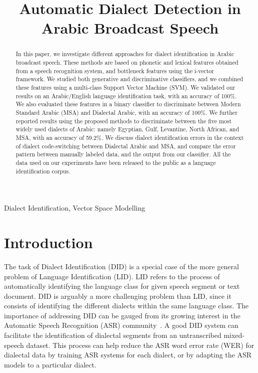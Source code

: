 \documentclass{article}
\title{Automatic Dialect Detection in Arabic Broadcast Speech}
\begin{document}
\maketitle


\begin{abstract}
In this paper, we investigate different approaches for dialect identification in Arabic broadcast speech. These methods are based on phonetic and lexical features obtained from a speech recognition system, and bottleneck features using the i-vector framework. We studied both generative and discriminative classifiers, and we combined these features using a multi-class Support Vector Machine (SVM). We validated our results on an Arabic/English language identification task, with an accuracy of 100\%. We also evaluated these features in a binary classifier to discriminate between Modern Standard Arabic (MSA) and Dialectal Arabic, with an accuracy of 100\%.  We further reported results using the proposed methods to discriminate between the five most widely used dialects of Arabic: namely Egyptian, Gulf, Levantine, North African, and MSA, with an accuracy of 59.2\%. We discuss dialect identification errors in the context of dialect code-switching between Dialectal Arabic and MSA, and compare the error pattern between manually labeled data, and the output from our classifier. All the data used on our experiments have been released to the public as a language identification corpus.  \end{abstract}

\begin{keywords}
Dialect Identification, Vector Space Modelling
\end{keywords}


\section{Introduction}
\label{sec:intro}

The task of Dialect Identification (DID) is a special case of the more general problem of Language Identification (LID). LID refers to the process of automatically identifying the language class for given speech segment or text document.  DID is arguably a more challenging problem than LID, since it consists of identifying the different dialects within the same language class. The importance of addressing DID can be gauged from its growing interest in the Automatic Speech Recognition (ASR) community~\cite{liu2010dialect}. A good DID system can facilitate the identification of dialectal segments from an untranscribed mixed-speech dataset. This process can help reduce the ASR word error rate (WER) for dialectal data by training ASR systems for each dialect, or by adapting the ASR models to a particular dialect.
\end{document}
